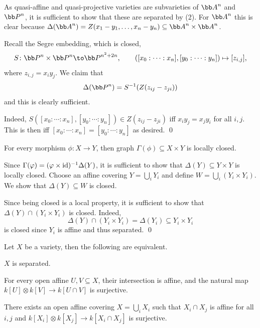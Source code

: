         \item As quasi-affine and quasi-projective varieties are subvarieties of $\bA^n$ and $\bP^n$, it is sufficient to
        show that these are separated by (2).
        For $\bA^n$ this is clear because $\Delta(\bA^n)=Z(x_1-y_1,\dots,x_n-y_n)\subseteq\bA^n\times\bA^n$.

        Recall the Segre embedding, which is closed,
        $$ S\colon\bP^n\times\bP^n \to \bP^{n^2+2n},\qquad ([x_0:\cdots:x_n],[y_0:\cdots:y_n]) \mapsto [z_{i,j}] , $$
        where $z_{i,j}=x_iy_j$.
        We claim that
        $$ \Delta(\bP^n) = S^{-1}(Z(z_{ij}-z_{ji})) $$
        and this is clearly sufficient.

        Indeed, $S([x_0:\cdots:x_n],[y_0:\cdots:y_n])\in Z(z_{ij}-z_{ji})$ iff $x_iy_j=x_jy_i$ for all $i,j$.
        This is then iff $[x_0:\cdots:x_n]=[y_0:\cdots:y_n]$ as desired.
        \qed
    \eenum

\eproof

\blemm

    For every morphism $\phi\colon X\to Y$, then graph $\Gamma(\phi)\subseteq X\times Y$ is locally closed.

\elemm

\bproof

    Since $\Gamma(\varphi)=(\varphi\times{\rm id})^{-1}\Delta(Y)$, it is sufficient to show that $\Delta(Y)\subseteq Y\times Y$
    is locally closed.
    Choose an affine covering $Y=\bigcup_iY_i$ and define $W=\bigcup_i(Y_i\times Y_i)$.
    We show that $\Delta(Y)\subseteq W$ is closed.

    Since being closed is a local property, it is sufficient to show that $\Delta(Y)\cap(Y_i\times Y_i)$ is closed.
    Indeed,
    $$ \Delta(Y)\cap(Y_i\times Y_i) = \Delta(Y_i) \subseteq Y_i\times Y_i $$
    is closed since $Y_i$ is affine and thus separated.
    \qed

\eproof

\bprop

    Let $X$ be a variety, then the following are equivalent.
    \benum
        \item $X$ is separated.
        \item For every open affine $U,V\subseteq X$, their intersection is affine, and the natural map
        $k[U]\otimes k[V]\to k[U\cap V]$ is surjective.
        \item There exists an open affine covering $X=\bigcup_iX_i$ such that $X_i\cap X_j$ is affine for all $i,j$
        and $k[X_i]\otimes k[X_j]\to k[X_i\cap X_j]$ is surjective.
    \eenum

